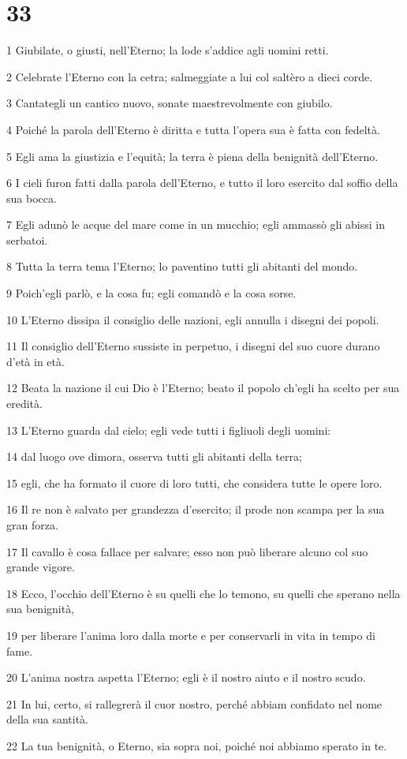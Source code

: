 \chapter{33}

\par 1 Giubilate, o giusti, nell'Eterno; la lode s'addice agli uomini retti.
\par 2 Celebrate l'Eterno con la cetra; salmeggiate a lui col saltèro a dieci corde.
\par 3 Cantategli un cantico nuovo, sonate maestrevolmente con giubilo.
\par 4 Poiché la parola dell'Eterno è diritta e tutta l'opera sua è fatta con fedeltà.
\par 5 Egli ama la giustizia e l'equità; la terra è piena della benignità dell'Eterno.
\par 6 I cieli furon fatti dalla parola dell'Eterno, e tutto il loro esercito dal soffio della sua bocca.
\par 7 Egli adunò le acque del mare come in un mucchio; egli ammassò gli abissi in serbatoi.
\par 8 Tutta la terra tema l'Eterno; lo paventino tutti gli abitanti del mondo.
\par 9 Poich'egli parlò, e la cosa fu; egli comandò e la cosa sorse.
\par 10 L'Eterno dissipa il consiglio delle nazioni, egli annulla i disegni dei popoli.
\par 11 Il consiglio dell'Eterno sussiste in perpetuo, i disegni del suo cuore durano d'età in età.
\par 12 Beata la nazione il cui Dio è l'Eterno; beato il popolo ch'egli ha scelto per sua eredità.
\par 13 L'Eterno guarda dal cielo; egli vede tutti i figliuoli degli uomini:
\par 14 dal luogo ove dimora, osserva tutti gli abitanti della terra;
\par 15 egli, che ha formato il cuore di loro tutti, che considera tutte le opere loro.
\par 16 Il re non è salvato per grandezza d'esercito; il prode non scampa per la sua gran forza.
\par 17 Il cavallo è cosa fallace per salvare; esso non può liberare alcuno col suo grande vigore.
\par 18 Ecco, l'occhio dell'Eterno è su quelli che lo temono, su quelli che sperano nella sua benignità,
\par 19 per liberare l'anima loro dalla morte e per conservarli in vita in tempo di fame.
\par 20 L'anima nostra aspetta l'Eterno; egli è il nostro aiuto e il nostro scudo.
\par 21 In lui, certo, si rallegrerà il cuor nostro, perché abbiam confidato nel nome della sua santità.
\par 22 La tua benignità, o Eterno, sia sopra noi, poiché noi abbiamo sperato in te.

